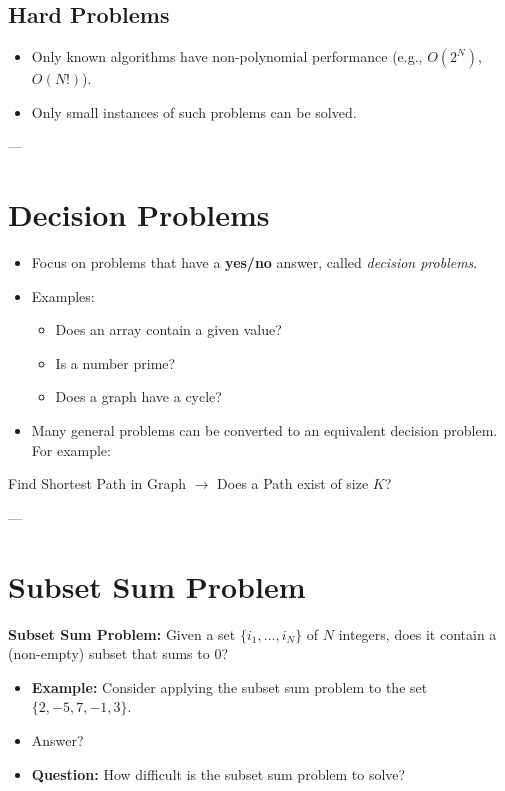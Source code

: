 \documentclass[a4paper,12pt]{article}
\begin{document}
\subsection*{Hard Problems}
\begin{itemize}
    \item Only known algorithms have non-polynomial performance (e.g., \(O(2^N)\), \(O(N!)\)).
    \item Only small instances of such problems can be solved.
\end{itemize}

---

\section*{Decision Problems}

\begin{itemize}[label=$\bullet$]
    \item Focus on problems that have a \textbf{yes/no} answer, called \textit{decision problems}.
    \item Examples:
    \begin{itemize}
        \item Does an array contain a given value?
        \item Is a number prime?
        \item Does a graph have a cycle?
    \end{itemize}
    \item Many general problems can be converted to an equivalent decision problem. For example:
\end{itemize}

\begin{tcolorbox}[colback=blue!5, colframe=blue!75!black, title=Example]
    Find Shortest Path in Graph \(\to\) Does a Path exist of size \(K\)?
\end{tcolorbox}

---

\section*{Subset Sum Problem}

\textbf{Subset Sum Problem:} Given a set \(\{i_1, \dots, i_N\}\) of \(N\) integers, does it contain a (non-empty) subset that sums to 0?

\begin{itemize}[label=$\bullet$]
    \item \textbf{Example:} Consider applying the subset sum problem to the set \(\{2, -5, 7, -1, 3\}\). 
    \item Answer?
    \item \textbf{Question:} How difficult is the subset sum problem to solve?
\end{itemize}
\end{document}
